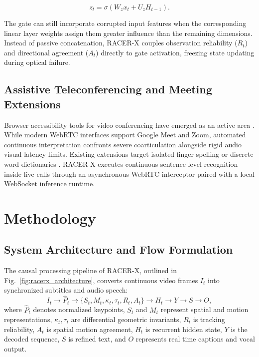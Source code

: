 \documentclass[conference]{IEEEtran}
\begin{document}
\[
z_t = \sigma(W_z x_t + U_z H_{t-1}).
\]

The gate can still incorporate corrupted input features when the corresponding linear layer weights assign them greater influence than the remaining dimensions. Instead of passive concatenation, RACER-X couples observation reliability ($R_t$) and directional agreement ($A_t$) directly to gate activation, freezing state updating during optical failure.

\subsection{Assistive Teleconferencing and Meeting Extensions}
Browser accessibility tools for video conferencing have emerged as an active area \cite{b9}. While modern WebRTC interfaces support Google Meet and Zoom, automated continuous interpretation confronts severe coarticulation alongside rigid audio visual latency limits. Existing extensions target isolated finger spelling or discrete word dictionaries \cite{b9}. RACER-X executes continuous sentence level recognition inside live calls through an asynchronous WebRTC interceptor paired with a local WebSocket inference runtime.

\section{Methodology}

\subsection{System Architecture and Flow Formulation}
The causal processing pipeline of RACER-X, outlined in Fig.~\ref{fig:racerx_architecture}, converts continuous video frames $I_t$ into synchronized subtitles and audio speech:
\begin{equation}
I_t \xrightarrow{} \hat{P}_t \xrightarrow{} \{S_t, M_t, \kappa_t, \tau_t, R_t, A_t\} \xrightarrow{} H_t \xrightarrow{} Y \xrightarrow{} S \xrightarrow{} O,
\label{eq:pipeline_math}
\end{equation}
where $\hat{P}_t$ denotes normalized keypoints, $S_t$ and $M_t$ represent spatial and motion representations, $\kappa_t, \tau_t$ are differential geometric invariants, $R_t$ is tracking reliability, $A_t$ is spatial motion agreement, $H_t$ is recurrent hidden state, $Y$ is the decoded sequence, $S$ is refined text, and $O$ represents real time captions and vocal output.
\end{document}

